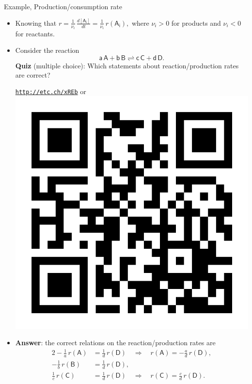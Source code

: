 \begin{frame}{Example, Production/consumption rate}
	
	\begin{itemize}
		\item Knowing that $r = \tfrac{1}{\nu_i}  \, \tfrac{d [ \mathsf{A_i}]}{dt} = \tfrac{1}{\nu_i} \, r(\mathsf{A_i}),$ where $\nu_i > 0$ for products and $\nu_i < 0$ for reactants. 
		\pause
		\item Consider the reaction 
		$$\mathsf{a\, A + b\, B \rightleftharpoons c \, C + d \, D}.$$
		\alert{\bf Quiz} (multiple choice): Which statements about reaction/production rates are correct?
		\begin{center}
			\href{http://etc.ch/xREb}{\textcolor{indigo(dye)}{\tt http://etc.ch/xREb}} or 
			\includegraphics[height=0.15\columnwidth]{figures/chemical-kinetics/polls.png}
		\end{center}
		\hiddenpause 
		\vskip 10pt
		\item {\bf Answer}: the correct relations on the reaction/production rates are
		\begin{alignat*}{2}
		- \tfrac{1}{a} \, r(\mathsf{A}) & = \tfrac{1}{d}\,  r(\mathsf{D}) \quad \Rightarrow \quad r(\mathsf{A}) = - \tfrac{a}{d} \,  r(\mathsf{D}), \\
		- \tfrac{1}{b} \, r(\mathsf{B}) &  = \tfrac{1}{d} \,  r(\mathsf{D}), \\
		\tfrac{1}{c} \,  r(\mathsf{C})  & = \tfrac{1}{d} \,  r(\mathsf{D}) \quad \Rightarrow \quad r(\mathsf{C}) = \tfrac{c}{d} \,  r(\mathsf{D}).
		\end{alignat*}	
	\end{itemize}
\end{frame}
%
%
